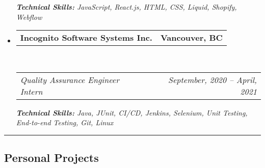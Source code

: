 \documentclass[10pt,a4paper]{article}
\makeatletter
\newcommand{\headerrow}[2]
{\begin{tabular*}{\linewidth}{l@{\extracolsep{\fill}}r}
	#1 &
	#2 \\
\end{tabular*}}
\makeatother
\begin{document}
\begin{itemize}[leftmargin=0em]
        \hspace{10px} {\small{\emph{\textbf{Technical Skills:} JavaScript, React.js, HTML, CSS, Liquid, Shopify, Webflow}}}
	
	\item[]
	\headerrow
		{\textbf{Incognito Software Systems Inc.}}
		{\textbf{Vancouver, BC}}
	\\
	\headerrow
		{\emph{Quality Assurance Engineer Intern}}
		{\emph{September, 2020 -- April, 2021}}
		
 
        \hspace{10px} \small{\emph{\textbf{Technical Skills:} Java, JUnit, CI/CD, Jenkins, Selenium, Unit Testing, End-to-end Testing, Git, Linux}}
	
\end{itemize}

\vspace{.2em}
\hrule %
\vspace{-0.4em}

\subsection*{Personal Projects}
\end{document}
